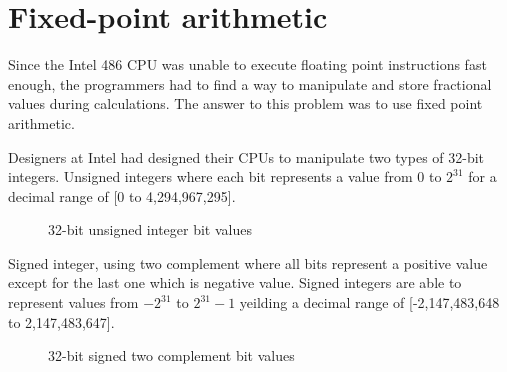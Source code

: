 \section{Fixed-point arithmetic}
Since the Intel 486 CPU was unable to execute floating point instructions fast enough, the programmers had to find a way to manipulate and store fractional values during calculations. The answer to this problem was to use fixed point arithmetic.\\
\par
Designers at Intel had designed their CPUs to manipulate two types of 32-bit integers. Unsigned integers where each bit represents a value from $0$ to $2^{31}$ for a decimal range of [0 to 4,294,967,295].\\
\par
\begin{figure}[H]
 \centering
  
 \caption{32-bit unsigned integer bit values} 
\end{figure}
\par
Signed integer, using two complement where all bits represent a positive value except for the last one which is negative value. Signed integers are able to represent values from $-2^{31}$ to $2^{31}-1$ yeilding a decimal range of [-2,147,483,648 to 2,147,483,647].\\
\par
\begin{figure}[H]
 \centering
  
 \caption{32-bit signed two complement bit values} 
\end{figure}
\par


